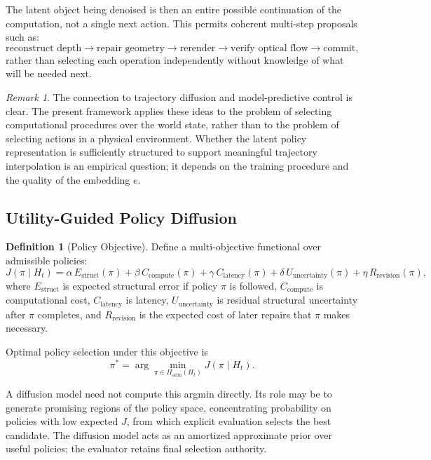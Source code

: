 \documentclass[12pt,a4paper]{article}
\theoremstyle{plain}
\theoremstyle{definition}
\newtheorem{definition}[theorem]{Definition}
\theoremstyle{remark}
\newtheorem{remark}[theorem]{Remark}
\begin{document}
The latent object being denoised is then an entire possible continuation of the computation, not a single next action. This permits coherent multi-step proposals such as:
\[
\text{reconstruct depth} \to \text{repair geometry} \to \text{rerender} \to \text{verify optical flow} \to \text{commit},
\]
rather than selecting each operation independently without knowledge of what will be needed next.

\begin{remark}
The connection to trajectory diffusion \cite{janner2022diffuser} and model-predictive control \cite{garcia1989mpc} is clear. The present framework applies these ideas to the problem of selecting computational procedures over the world state, rather than to the problem of selecting actions in a physical environment. Whether the latent policy representation is sufficiently structured to support meaningful trajectory interpolation is an empirical question; it depends on the training procedure and the quality of the embedding $e$.
\end{remark}

\subsection{Utility-Guided Policy Diffusion}

\begin{definition}[Policy Objective]
Define a multi-objective functional over admissible policies:
\[
J(\pi \mid H_t) =
\alpha\, E_{\mathrm{struct}}(\pi)
+ \beta\, C_{\mathrm{compute}}(\pi)
+ \gamma\, C_{\mathrm{latency}}(\pi)
+ \delta\, U_{\mathrm{uncertainty}}(\pi)
+ \eta\, R_{\mathrm{revision}}(\pi),
\]
where $E_{\mathrm{struct}}$ is expected structural error if policy $\pi$ is followed, $C_{\mathrm{compute}}$ is computational cost, $C_{\mathrm{latency}}$ is latency, $U_{\mathrm{uncertainty}}$ is residual structural uncertainty after $\pi$ completes, and $R_{\mathrm{revision}}$ is the expected cost of later repairs that $\pi$ makes necessary.
\end{definition}

Optimal policy selection under this objective is
\[
\pi^* = \arg\min_{\pi \in \Pi_{\mathrm{adm}}(H_t)} J(\pi \mid H_t).
\]

A diffusion model need not compute this argmin directly. Its role may be to generate promising regions of the policy space, concentrating probability on policies with low expected $J$, from which explicit evaluation selects the best candidate. The diffusion model acts as an amortized approximate prior over useful policies; the evaluator retains final selection authority.
\end{document}
